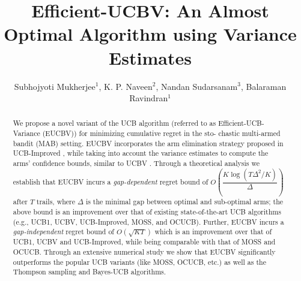\documentclass{llncs}
\begin{document}
%
\frontmatter          %
%
\pagestyle{headings}  %

\mainmatter              %
%
\title{Efficient-UCBV: An Almost Optimal Algorithm using Variance Estimates}
%
%
\author{Subhojyoti Mukherjee${}^1$, K. P. Naveen${}^2$, Nandan
Sudarsanam${}^3$, Balaraman Ravindran${}^1$}
%
%
%

\maketitle   %

\begin{abstract}
We propose a novel variant of the UCB algorithm (referred to as Efficient-UCB-Variance (EUCBV)) for minimizing cumulative regret in the sto- chastic multi-armed bandit (MAB) setting. EUCBV incorporates the arm elimination strategy proposed in UCB-Improved \cite{auer2010ucb}, while taking into account the variance estimates to compute the arms' confidence bounds, similar to UCBV \cite{audibert2009exploration}. Through a theoretical analysis we establish that EUCBV incurs a \emph{gap-dependent} regret bound of {\scriptsize $O\left( \dfrac{K\log (T\Delta^2 /K)}{\Delta}\right)$} after $T$ trails, where $\Delta$ is the minimal gap between optimal and sub-optimal arms; the above bound is an improvement over that of existing state-of-the-art UCB algorithms (e.g.,  UCB1, UCBV, UCB-Improved, MOSS, and OCUCB). Further, EUCBV incurs a \emph{gap-independent} regret bound of {\scriptsize $O\left(\sqrt{KT}\right)$}  which is an improvement over that of UCB1, UCBV and UCB-Improved, while being comparable with that of MOSS and OCUCB. Through an extensive numerical study we show that EUCBV significantly outperforms the popular UCB variants (like MOSS, OCUCB, etc.) as well as the Thompson sampling and Bayes-UCB algorithms. 

\end{abstract}
\end{document}
